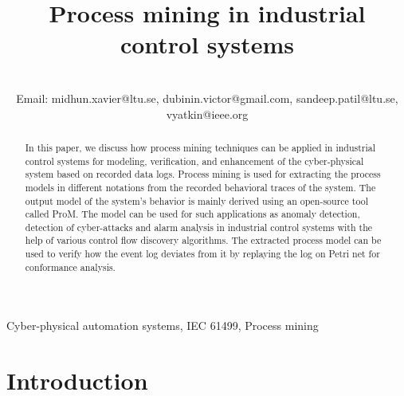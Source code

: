 \documentclass[conference]{IEEEtran}
\begin{document}
\title{Process mining in industrial control systems }

\author{







\\ Email: midhun.xavier@ltu.se, dubinin.victor@gmail.com, sandeep.patil@ltu.se, vyatkin@ieee.org
}


\maketitle

\begin{abstract}


In this paper, we discuss how process mining techniques can be applied in industrial control systems for modeling, verification, and enhancement of the cyber-physical system based on recorded data logs. Process mining is used for extracting the process models in different notations from the recorded behavioral traces of the system. The output model of the system’s behavior is mainly derived using an open-source tool called ProM. The model can be used for such applications as anomaly detection, detection of cyber-attacks and alarm analysis in industrial control systems with the help of various control flow discovery algorithms. The extracted process model can be used to verify how the event log deviates from it by replaying the log on Petri net for conformance analysis.


\end{abstract}

\begin{IEEEkeywords}
 Cyber-physical automation systems, IEC 61499, Process mining
\end{IEEEkeywords}

\section{Introduction}
 
\end{document}
